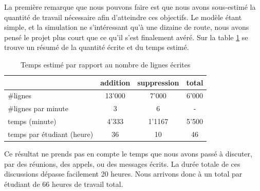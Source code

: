 \documentclass[a4paper,11pt, titlepage]{extarticle}
\begin{document}
La première remarque que nous pouvons faire est que nous avons sous-estimé la quantité de travail nécessaire afin d'atteindre ces objectifs. Le modèle étant simple, et la simulation ne s'intéressant qu'à une dizaine de route, nous avons pensé le projet plus court que ce qu'il s'est finalement avéré. Sur la table \ref{tabTemps} se trouve un résumé de la quantité écrite et du temps estimé.

\begin{table}[h!]
\begin{center}
\begin{tabular}{|l|c|c|c|}
\hline
 & addition & suppression & total\\ \hline
\#lignes & 13'000 & 7'000 & 6'000\\ \hline
\#lignes par minute & 3 & 6 & - \\ \hline\hline
temps (minute) & 4'333 & 1'1167 & 5'500\\ \hline
temps par étudiant (heure) & 36 & 10 & 46\\ \hline
\end{tabular}
\end{center}
\caption{Temps estimé par rapport au nombre de lignes écrites}
\label{tabTemps}
\end{table}

Ce résultat ne prends pas en compte le temps que nous avons passé à discuter, par des réunions, des appels, ou des messages écrits. La durée totale de ces discussions dépasse facilement 20 heures. Nous arrivons donc à un total par étudiant de 66 heures de travail total.
\end{document}
